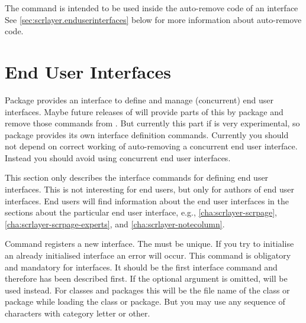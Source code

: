 The command is intended to be used inside the auto-remove code of an interface
See \autoref{sec:scrlayer.enduserinterfaces} below for more information about
auto-remove code.%
\EndIndexGroup



\section{End User Interfaces}

Package  provides an interface to define and manage
(concurrent) end user interfaces. Maybe future releases of \KOMAScript{} will
provide parts of this by package  and remove those commands
from . But currently this part if  is very
experimental, so package  provides its own interface
definition commands. Currently you should not depend on correct working of
auto-removing a concurrent end user interface. Instead you should avoid using
concurrent end user interfaces.

This section only describes the interface commands for defining end user
interfaces. This is not interesting for end users, but only for authors of end
user interfaces. End users will find information about the end user interfaces
in the sections about the particular end user interface, e.g.,
\autoref{cha:scrlayer-scrpage}, \autoref{cha:scrlayer-scrpage-experts}, and
\autoref{cha:scrlayer-notecolumn}.

\begin{Declaration}
\end{Declaration}
Command 
registers a new interface. The  must be unique. If you
try to initialise an already initialised interface an error will occur. This
command is obligatory and mandatory for interfaces. It should be the first
interface command and therefore has been described first. If the optional
argument is omitted,  will be
used instead. For classes and packages this will be the file name of the class
or package while loading the class or package. But you may use any sequence of
characters with category letter or other.%
\EndIndexGroup


